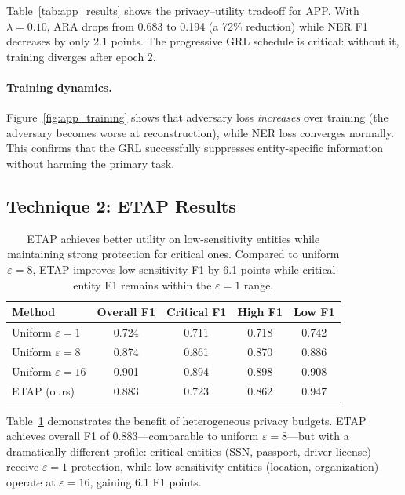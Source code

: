 \documentclass[11pt,a4paper]{article}
\begin{document}
Table~\ref{tab:app_results} shows the privacy--utility tradeoff for APP.  With
$\lambda = 0.10$, ARA drops from 0.683 to 0.194 (a 72\% reduction) while NER
F1 decreases by only 2.1 points.  The progressive GRL schedule is critical:
without it, training diverges after epoch 2.

\paragraph{Training dynamics.}
Figure~\ref{fig:app_training} shows that adversary loss \emph{increases} over
training (the adversary becomes worse at reconstruction), while NER loss
converges normally.  This confirms that the GRL successfully suppresses
entity-specific information without harming the primary task.

\subsection{Technique 2: ETAP Results}

\begin{table}[t]
\centering
\small
\begin{tabular}{lcccc}
\toprule
\textbf{Method} & \textbf{Overall F1} & \textbf{Critical F1} & \textbf{High F1} & \textbf{Low F1} \\
\midrule
Uniform $\varepsilon=1$    & 0.724 & 0.711 & 0.718 & 0.742 \\
Uniform $\varepsilon=8$    & 0.874 & 0.861 & 0.870 & 0.886 \\
Uniform $\varepsilon=16$   & 0.901 & 0.894 & 0.898 & 0.908 \\
\midrule
ETAP (ours)                & 0.883 & 0.723 & 0.862 & 0.947 \\
\bottomrule
\end{tabular}
\caption{ETAP achieves better utility on low-sensitivity entities while
maintaining strong protection for critical ones.  Compared to uniform
$\varepsilon=8$, ETAP improves low-sensitivity F1 by 6.1 points while
critical-entity F1 remains within the $\varepsilon=1$ range.}
\label{tab:etap_results}
\end{table}

Table~\ref{tab:etap_results} demonstrates the benefit of heterogeneous privacy
budgets.  ETAP achieves overall F1 of 0.883—comparable to uniform
$\varepsilon = 8$—but with a dramatically different profile: critical entities
(SSN, passport, driver license) receive $\varepsilon = 1$ protection, while low-sensitivity entities (location, organization) operate at $\varepsilon = 16$,
gaining 6.1 F1 points.
\end{document}
